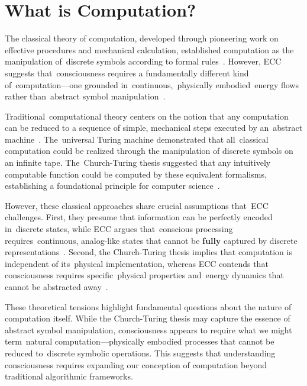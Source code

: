 \section{What is Computation?}

The classical theory of computation, developed through pioneering work on effective procedures and mechanical calculation, established computation as the manipulation of~discrete symbols according to formal rules~\cite{turing1936}. However, ECC suggests that~consciousness requires a fundamentally different kind of~computation—one grounded in~continuous,~physically embodied~energy flows rather than~abstract symbol manipulation~\cite{da2024mathematical}.

Traditional~computational theory centers on the notion that any computation can be reduced to a sequence of simple, mechanical steps executed by an~abstract machine~\cite{landauer1996}. The~universal Turing machine demonstrated that all~classical computation could be realized through the manipulation of discrete symbols on an infinite tape. The~Church-Turing thesis suggested that any intuitively computable function could be computed by these equivalent formalisms, establishing a foundational principle for computer science~\cite{butlin2023consciousnessartificialintelligenceinsights}.

However, these classical approaches share crucial assumptions that~ECC challenges. First, they presume that information can be perfectly encoded in~discrete states, while ECC argues that~conscious processing requires~continuous, analog-like states that cannot be \textbf{fully} captured by discrete representations~\cite{pinotsis2023cytoelectric}. Second, the Church-Turing thesis implies that computation is independent of its~physical implementation, whereas ECC contends that consciousness requires specific~physical properties and~energy dynamics that cannot be abstracted away~\cite{hunt2024electromagnetic}.

These theoretical tensions highlight fundamental questions about the nature of computation itself. While the Church-Turing thesis may capture the essence of abstract symbol manipulation, consciousness appears to require what we might term~natural computation—physically embodied processes that cannot be reduced to~discrete symbolic operations. This suggests that understanding consciousness requires expanding our conception of computation beyond traditional algorithmic frameworks.

